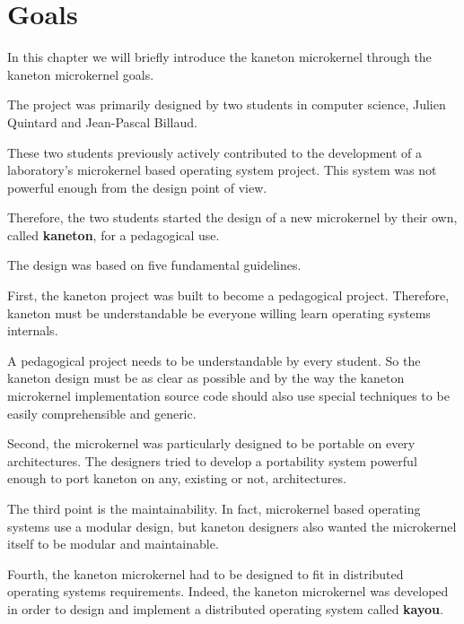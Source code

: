 
%
%

\chapter{Goals}

In this chapter we will briefly introduce the kaneton microkernel
through the kaneton microkernel goals.

\newpage

%
%

The project was primarily designed by two students in computer science,
Julien Quintard and Jean-Pascal Billaud.

These two students previously actively contributed to the development
of a laboratory's microkernel based operating system project. This system
was not powerful enough from the design point of view.

Therefore, the two students started the design of a new microkernel
by their own, called \textbf{kaneton}, for a pedagogical use.

The design was based on five fundamental guidelines.

First, the kaneton project was built to become a pedagogical project.
Therefore, kaneton must be understandable be everyone willing learn
operating systems internals.

A pedagogical project needs to be understandable by every student. So
the kaneton design must be as clear as possible and by the way the
kaneton microkernel implementation source code should also use
special techniques to be easily comprehensible and generic.

Second, the microkernel was particularly designed to be portable on every
architectures. The designers tried to develop a portability system powerful
enough to port kaneton on any, existing or not, architectures.

The third point is the maintainability. In fact, microkernel based
operating systems use a modular design, but kaneton designers
also wanted the microkernel itself to be modular and maintainable.

Fourth, the kaneton microkernel had to be designed to fit in distributed
operating systems requirements. Indeed, the kaneton microkernel was
developed in order to design and implement a distributed operating
system called \textbf{kayou}.


